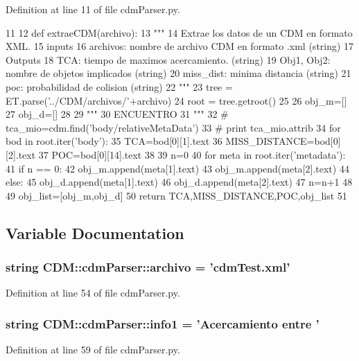 \-Definition at line 11 of file cdm\-Parser.\-py.


\begin{DoxyCode}
11 
12 def extraeCDM(archivo):
13     """
14     Extrae los datos de un CDM en formato XML.
15     inputs
16         archivos: nombre de archivo CDM en formato .xml (string)
17     Outputs
18         TCA: tiempo de maximos acercamiento. (string)
19         Obj1, Obj2: nombre de objetos implicados (string)
20         miss_dist: minima distancia (string)
21         poc: probabilidad de colision (string)
22     """
23     tree = ET.parse('../CDM/archivos/'+archivo)
24     root = tree.getroot()
25 
26     obj_m=[]
27     obj_d=[]
28 
29     """
30     ENCUENTRO
31     """
32 #     tca_mio=cdm.find('body/relativeMetaData')
33 #     print tca_mio.attrib
34     for bod in root.iter('body'):
35         TCA=bod[0][1].text
36         MISS_DISTANCE=bod[0][2].text
37         POC=bod[0][14].text
38         
39     n=0    
40     for meta in root.iter('metadata'):
41         if n == 0:
42             obj_m.append(meta[1].text)
43             obj_m.append(meta[2].text)
44         else:
45             obj_d.append(meta[1].text)
46             obj_d.append(meta[2].text)
47         n=n+1
48 
49     obj_list=[obj_m,obj_d]    
50     return TCA,MISS_DISTANCE,POC,obj_list
51     
    
\end{DoxyCode}


\subsection{\-Variable \-Documentation}
\subsubsection[{archivo}]{\setlength{\rightskip}{0pt plus 5cm}string {\bf \-C\-D\-M\-::cdm\-Parser\-::archivo} = 'cdm\-Test.\-xml'}\label{namespace_c_d_m_1_1cdm_parser_a596846ed946122c4c50bf17746fcc8c1}


\-Definition at line 54 of file cdm\-Parser.\-py.

\subsubsection[{info1}]{\setlength{\rightskip}{0pt plus 5cm}string {\bf \-C\-D\-M\-::cdm\-Parser\-::info1} = '\-Acercamiento entre '}\label{namespace_c_d_m_1_1cdm_parser_af6b27ddcc8dbdf433fe024867c90dbc8}


\-Definition at line 59 of file cdm\-Parser.\-py.

